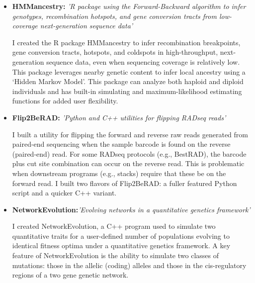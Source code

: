\documentclass[11pt,a4paper,sans]{moderncv}        %
\begin{document}
\begin{itemize}

\item{\textbf{HMMancestry:} \textit{'R package using the Forward-Backward algorithm to infer genotypes, recombination hotspots, and gene conversion tracts from low-coverage next-generation sequence data'}

\vspace{3pt}

\small{I created the R package HMMancestry to infer recombination breakpoints, gene conversion tracts, hotspots, and coldspots in high-throughput, next-generation sequence data, even when sequencing coverage is relatively low. This package leverages nearby genetic content to infer local ancestry using a `Hidden Markov Model'. This package can analyze both haploid and diploid individuals and has built-in simulating and maximum-likelihood estimating functions for added user flexibility.}}


\item{\textbf{Flip2BeRAD:} \textit{'Python and C++ utilities for flipping RADseq reads'}

\vspace{3pt}

\small{I built a utility for flipping the forward and reverse raw reads generated from paired-end sequencing when the sample barcode is found on the reverse (paired-end) read. For some RADseq protocols (e.g., BestRAD), the barcode plus cut site combination can occur on the reverse read. This is problematic when downstream programs (e.g., stacks) require that these be on the forward read. I built two flavors of Flip2BeRAD: a fuller featured Python script and a quicker C++ variant.}}

\vspace{6pt}

\item{\textbf{NetworkEvolution:}\textit{'Evolving networks in a quantitative genetics framework'}

\vspace{3pt}

\small{I created NetworkEvolution, a C++ program used to simulate two quantitative traits for a user-defined number of populations evolving to identical fitness optima under a quantitative genetics framework. A key feature of NetworkEvolution is the ability to simulate two classes of mutations: those in the allelic (coding) alleles and those in the cis-regulatory regions of a two gene genetic network.}}

\end{itemize}
\end{document}
